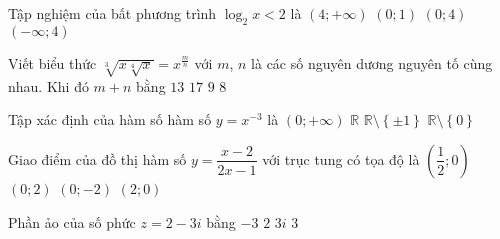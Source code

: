 \begin{ex}%
Tập nghiệm của bất phương trình $ \log_2 x<2 $ là
\choice
{$ \left( 4;+\infty \right) $}
{$ \left( 0;1 \right) $}
{\True $ \left( 0;4 \right) $}
{$ \left( -\infty;4 \right) $}
\end{ex}
\begin{ex} %
	Viết biểu thức $ \sqrt[3]{x\sqrt[4]{x}}=x^{\tfrac{m}{n}} $	với  $ m $,  $ n $ là các số nguyên dương nguyên tố cùng nhau. Khi đó $ m+n $  bằng
\choice 
{$ 13 $}
{\True $ 17 $}	
{ $ 9 $}	
{ $ 8 $}
\end{ex}
\begin{ex} %
Tập xác định của hàm số hàm số $ y=x^{-3} $  là
\choice
{$ \left( 0;+\infty \right) $}
{$ \mathbb{R} $}
{$ \mathbb{R}\setminus \left\lbrace \pm 1 \right\rbrace  $}
{\True $ \mathbb{R}\setminus \left\lbrace 0 \right\rbrace  $}
\end{ex}
\begin{ex}%
	Giao điểm của đồ thị hàm số $ y=\dfrac{x-2}{2x-1} $ với trục tung có tọa độ là
\choice 
{ $\left(\dfrac{1}{2}; 0\right)$}
{\True  $\left( 0; 2 \right)$}
{ $\left( 0;-2 \right)$}
{ $\left( 2; 0 \right)$}
\end{ex}
\begin{ex} %
Phần ảo của số phức $ z=2-3i $ bằng
\choice
{\True $ -3 $}
{$ 2 $}
{$ 3i $}
{$ 3 $}
\end{ex}
